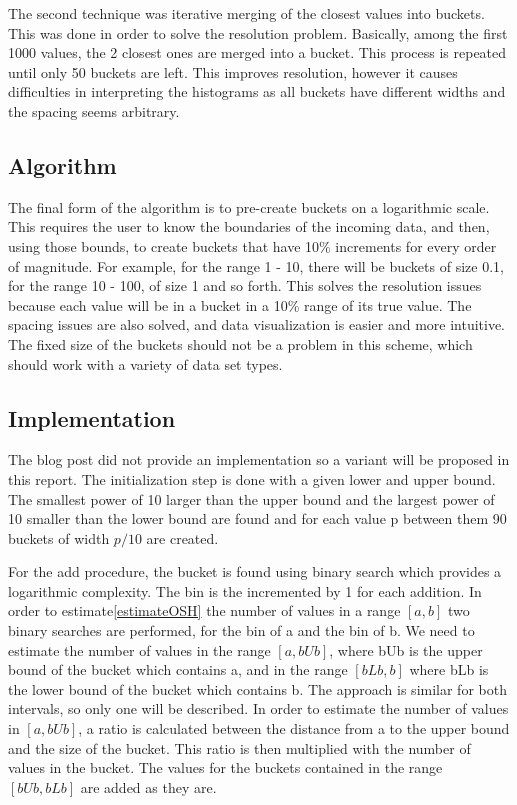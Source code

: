 \documentclass[12pt]{article}
\begin{document}
	The second technique was iterative merging of the closest values into buckets. 
	This was done in order to solve the resolution problem. Basically, among the 
	first 1000 values, the 2 closest ones are merged into a bucket. This process 
	is repeated until only 50 buckets are left. This improves resolution, however 
	it causes difficulties in interpreting the histograms as all buckets have 
	different widths and the spacing seems arbitrary. 

	\subsection{Algorithm}
	The final form of the algorithm is to pre-create buckets on a logarithmic 
	scale. This requires the user to know the boundaries of the incoming data, 
	and then, using those bounds, to create buckets that have 10\% increments 
	for every order of magnitude. For example, for the range 1 - 10, there will be 
	buckets of size 0.1, for the range 10 - 100, of size 1 and so forth. This solves
	the resolution issues because each value will be in a bucket in a 10\% range 
	of its true value. The spacing issues are also solved, and data visualization
	is easier and more intuitive. The fixed size of the buckets should not be a 
	problem in this scheme, which should work with a variety of data set types.

	\subsection{Implementation}
	The blog post did not provide an implementation so a variant will be 
	proposed in this report. The initialization step is done with a given 
	lower and upper bound. The smallest power of 10 larger than the upper bound 
	and the largest power of 10 smaller than the lower bound are found and 
	for each value p between them 90 buckets of width $p / 10$ are created.

	For the add procedure, the bucket is found using binary search which 
	provides a logarithmic complexity. The bin is the incremented by 1 
	for each addition. In order to estimate\ref{estimateOSH} the number of values in a range $ [a, b] $ 
	two binary searches are performed, for the bin of a and the bin of b. We 
	need to estimate the number of values in the range $[a, bUb]$, where bUb is the upper
	bound of the bucket which contains a, and in the range $[bLb, b]$ where bLb is the
	lower bound of the bucket which contains b. The approach is similar for both 
	intervals, so only one will be described. In order to estimate the number 
	of values in $[a, bUb]$, a ratio is calculated between the distance from 
	a to the upper bound and the size of the bucket. This ratio is then multiplied 
	with the number of values in the bucket. The values for the buckets contained 
	in the range $ [bUb, bLb] $ are added as they are.
	
\end{document}
